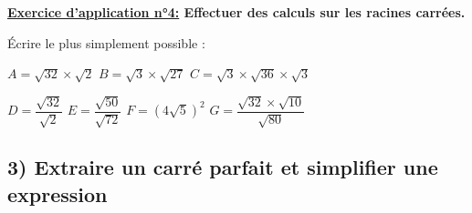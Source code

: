\documentclass[12pt]{article}
\begin{document}
\begin{mdframed}[
    linewidth=1pt,
    roundcorner=5pt,
    linecolor=RoyalBlue,
    innertopmargin=10pt,
    innerbottommargin=10pt
]
{\color{RoyalBlue}
\textbf{\underline{Exercice d'application n°4:} Effectuer des calculs sur les racines carrées.}}

\vspace{5pt}
Écrire le plus simplement possible : 

$A = \sqrt{32} \times \sqrt{2}$ \hspace{1cm} $B = \sqrt{3} \times \sqrt{27}$ 
\hspace{1cm} $C = \sqrt{3} \times \sqrt{36} \times \sqrt{3}$

\vspace{5pt}
$D = \dfrac{\sqrt{32}}{\sqrt{2}}$ \hspace{1cm} $E = \dfrac{\sqrt{50}}{\sqrt{72}}$ 
\hspace{1cm} $F = (4\sqrt{5})^2$ \hspace{1cm} $G = \dfrac{\sqrt{32} \times \sqrt{10}}{\sqrt{80}}$

\vspace{0.5cm}
{\color{black!30}\dotfill}

\vspace{0.5cm}
{\color{black!30}\dotfill}

\vspace{0.5cm}
{\color{black!30}\dotfill}

\vspace{0.5cm}
{\color{black!30}\dotfill}

\vspace{0.5cm}
{\color{black!30}\dotfill}

\vspace{0.5cm}
{\color{black!30}\dotfill}

\vspace{0.5cm}
{\color{black!30}\dotfill}

\vspace{0.5cm}
{\color{black!30}\dotfill}

\vspace{0.5cm}
{\color{black!30}\dotfill}

\vspace{20pt}
\end{mdframed}

\vspace{10pt}

\subsection*{\hspace{1cm} 3) Extraire un carré parfait et simplifier une expression}
\end{document}
